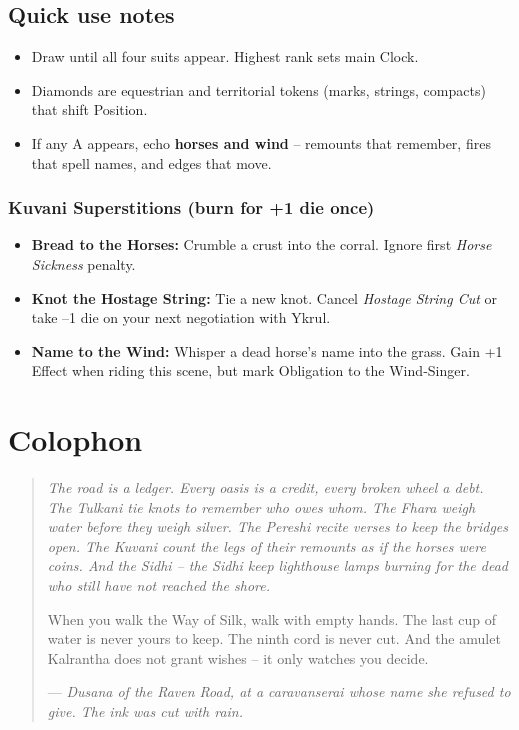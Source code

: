 \documentclass[11pt]{book}
\newenvironment{lorebox}{\begin{quote}\small\itshape}{\end{quote}}
\begin{document}
\section*{Quick use notes}
\begin{itemize}
\item Draw until all four suits appear. Highest rank sets main Clock.
\item Diamonds are equestrian and territorial tokens (marks, strings, compacts) that shift Position.
\item If any A appears, echo \textbf{horses and wind} – remounts that remember, fires that spell names, and edges that move.
\end{itemize}

\subsection*{Kuvani Superstitions (burn for +1 die once)}
\begin{itemize}
\item \textbf{Bread to the Horses:} Crumble a crust into the corral. Ignore first \textit{Horse Sickness} penalty.
\item \textbf{Knot the Hostage String:} Tie a new knot. Cancel \textit{Hostage String Cut} or take –1 die on your next negotiation with Ykrul.
\item \textbf{Name to the Wind:} Whisper a dead horse’s name into the grass. Gain +1 Effect when riding this scene, but mark Obligation to the Wind‑Singer.
\end{itemize}

\clearpage
\chapter*{Colophon}

\vspace{2\baselineskip}
\begin{lorebox}
The road is a ledger. Every oasis is a credit, every broken wheel a debt. The Tulkani tie knots to remember who owes whom. The Fhara weigh water before they weigh silver. The Pereshi recite verses to keep the bridges open. The Kuvani count the legs of their remounts as if the horses were coins. And the Sidhi – the Sidhi keep lighthouse lamps burning for the dead who still have not reached the shore.

When you walk the Way of Silk, walk with empty hands. The last cup of water is never yours to keep. The ninth cord is never cut. And the amulet Kalrantha does not grant wishes – it only watches you decide.

--- \textit{Dusana of the Raven Road, at a caravanserai whose name she refused to give. The ink was cut with rain.}
\end{lorebox}
\end{document}
